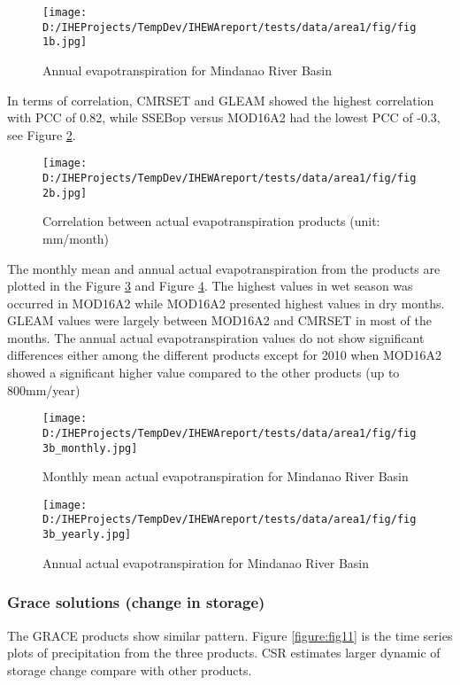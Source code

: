 \documentclass[oneside,openany]{article}%
\begin{document}
\begin{figure}[H]%
\centering%
\texttt{[image: D:/IHEProjects/TempDev/IHEWAreport/tests/data/area1/fig/fig1b.jpg]}%
\caption{Annual evapotranspiration  for Mindanao River Basin}%
\label{figure:fig7}%
\end{figure}

%
In terms of correlation, CMRSET and GLEAM showed the highest correlation with PCC of 0.82, while  SSEBop versus  MOD16A2 had the lowest PCC of  -0.3, see Figure \ref{figure:fig8}.%
\linebreak%


\begin{figure}[H]%
\centering%
\texttt{[image: D:/IHEProjects/TempDev/IHEWAreport/tests/data/area1/fig/fig2b.jpg]}%
\caption{Correlation between actual evapotranspiration products (unit: mm/month)}%
\label{figure:fig8}%
\end{figure}

%
The monthly mean and annual actual evapotranspiration from the products are plotted in the Figure \ref{figure:fig9} and Figure \ref{figure:fig10}. The highest values in wet season was occurred in MOD16A2 while MOD16A2 presented highest values in dry months. GLEAM values were largely between MOD16A2 and CMRSET in most of the months.%
\linebreak%
The annual actual evapotranspiration values do not show significant differences either among the different products except for 2010 when MOD16A2 showed a significant higher value compared to the other products (up to 800mm/year)%
\linebreak%


\begin{figure}[H]%
\centering%
\texttt{[image: D:/IHEProjects/TempDev/IHEWAreport/tests/data/area1/fig/fig3b\_monthly.jpg]}%
\caption{Monthly mean actual evapotranspiration for Mindanao River Basin}%
\label{figure:fig9}%
\end{figure}

%


\begin{figure}[H]%
\centering%
\texttt{[image: D:/IHEProjects/TempDev/IHEWAreport/tests/data/area1/fig/fig3b\_yearly.jpg]}%
\caption{Annual actual evapotranspiration for Mindanao River Basin}%
\label{figure:fig10}%
\end{figure}

%
\subsubsection{Grace solutions (change in storage)}%
\label{ssubsec:Gracesolutions(changeinstorage)}%
The GRACE products show similar pattern. Figure \ref{figure:fig11} is the time series plots of precipitation from the three products. CSR estimates larger dynamic of storage change compare with other products.%
\linebreak%
\end{document}
